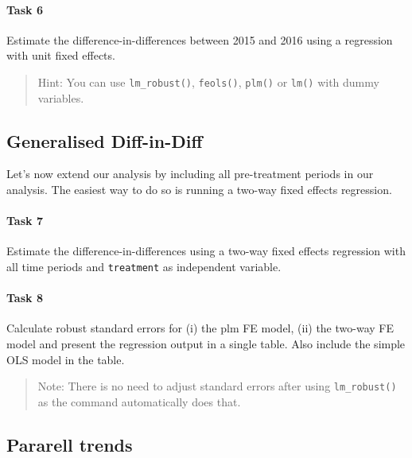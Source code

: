 \documentclass[
]{article}
\begin{document}
\paragraph{Task 6}\label{task-6}

Estimate the difference-in-differences between 2015 and 2016 using a
regression with unit fixed effects.

\begin{quote}
Hint: You can use \texttt{lm\_robust()}, \texttt{feols()},
\texttt{plm()} or \texttt{lm()} with dummy variables.
\end{quote}

\subsection{Generalised Diff-in-Diff}\label{generalised-diff-in-diff}

Let's now extend our analysis by including all pre-treatment periods in
our analysis. The easiest way to do so is running a two-way fixed
effects regression.

\paragraph{Task 7}\label{task-7}

Estimate the difference-in-differences using a two-way fixed effects
regression with all time periods and \texttt{treatment} as independent
variable.

\paragraph{Task 8}\label{task-8}

Calculate robust standard errors for (i) the plm FE model, (ii) the
two-way FE model and present the regression output in a single table.
Also include the simple OLS model in the table.

\begin{quote}
Note: There is no need to adjust standard errors after using
\texttt{lm\_robust()} as the command automatically does that.
\end{quote}

\subsection{Pararell trends}\label{pararell-trends}
\end{document}
